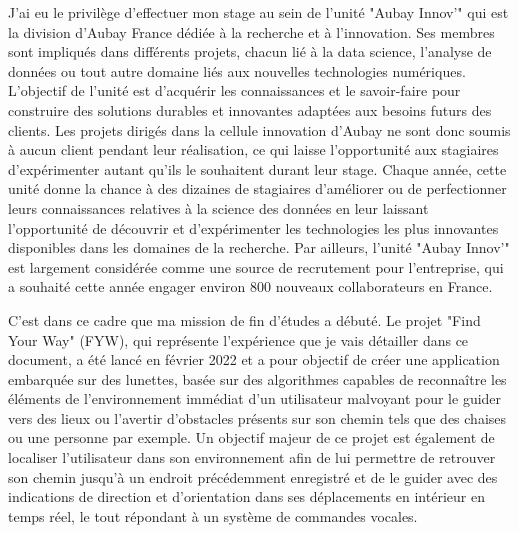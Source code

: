 \documentclass[11pt]{article}
\begin{document}
  J'ai eu le privilège d'effectuer mon stage au sein de l'unité "Aubay Innov'" qui est la division d’Aubay France dédiée 
  à la recherche et à l'innovation. Ses membres sont impliqués dans différents projets, chacun lié à la data science, l'analyse 
  de données ou tout autre domaine liés aux nouvelles technologies numériques. L'objectif de l'unité est d'acquérir 
  les connaissances et le savoir-faire pour construire des solutions durables et innovantes adaptées aux besoins futurs des clients. 
  Les projets dirigés dans la cellule innovation d'Aubay ne sont donc soumis à aucun client pendant leur réalisation, 
  ce qui laisse l'opportunité aux stagiaires d'expérimenter autant qu'ils le souhaitent durant leur stage.
  Chaque année, cette unité donne la chance à des dizaines de stagiaires d'améliorer ou de perfectionner leurs connaissances
  relatives à la science des données en leur laissant l'opportunité de découvrir et d'expérimenter les technologies les plus 
  innovantes disponibles dans les domaines de la recherche. Par ailleurs, l'unité "Aubay Innov'" est largement considérée comme 
  une source de recrutement pour l'entreprise, qui a souhaité cette année engager environ 800 nouveaux collaborateurs en France. 
  
  C'est dans ce cadre que ma mission de fin d'études a débuté. Le projet "Find Your Way" (FYW), qui représente l'expérience que je 
  vais détailler dans ce document, a été lancé en février 2022 et a pour objectif de créer une application embarquée sur des lunettes, 
  basée sur des algorithmes capables de reconnaître les éléments de l'environnement immédiat d'un utilisateur malvoyant pour le guider 
  vers des lieux ou l'avertir d'obstacles présents sur son chemin tels que des chaises ou une personne par exemple. Un objectif majeur 
  de ce projet est également de localiser l'utilisateur dans son environnement afin de lui permettre de retrouver son chemin jusqu'à
  un endroit précédemment enregistré et de le guider avec des indications de direction et d'orientation dans ses déplacements en intérieur
  en temps réel, le tout répondant à un système de commandes vocales.  
  
\end{document}
